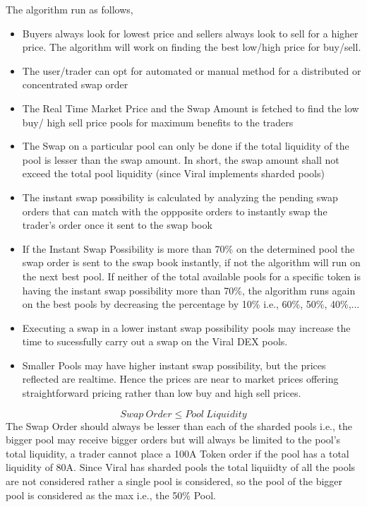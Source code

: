 \documentclass[10pt]{article}
\begin{document}
The algorithm run as follows,
\begin{itemize}[leftmargin=+0.2in]
\item Buyers always look for lowest price and sellers always look to sell for a higher price. The algorithm will work on finding the best low/high price for buy/sell.
\item The user/trader can opt for automated or manual method for a distributed or concentrated swap order
\item The Real Time Market Price and the Swap Amount is fetched to find the low buy/ high sell price pools for maximum benefits to the traders
\item The Swap on a particular pool can only be done if the total liquidity of the pool is lesser than the swap amount. In short, the swap amount shall not exceed the total pool liquidity (since Viral implements sharded pools)
\item The instant swap possibility is calculated by analyzing the pending swap orders that can match with the oppposite orders to instantly swap the trader's order once it sent to the swap book
\item If the Instant Swap Possibility is more than 70\% on the determined pool the swap order is sent to the swap book instantly, if not the algorithm will run on the next best pool. If neither of the total available pools for a specific token is having the instant swap possibility more than 70\%, the algorithm runs again on the best pools by decreasing the percentage by 10\% i.e., 60\%, 50\%, 40\%,...
\item Executing a swap in a lower instant swap possibility pools may increase the time to sucessfully carry out a swap on the Viral DEX pools.
\item Smaller Pools may have higher instant swap possibility, but the prices reflected are realtime. Hence the prices are near to market prices offering straightforward pricing rather than low buy and high sell prices.
\end{itemize}
\begin{equation}
Swap\:Order \leq Pool\:Liquidity 
\end{equation}
The Swap Order should always be lesser than each of the sharded pools i.e., the bigger pool may receive bigger orders but will always be limited to the pool's total liquidity, a trader cannot place a 100A Token order if the pool has a total liquidity of 80A. Since Viral has sharded pools the total liquiidty of all the pools are not considered rather a single pool is considered, so the pool of the bigger pool is considered as the max i.e., the 50\% Pool.\\
\end{document}
